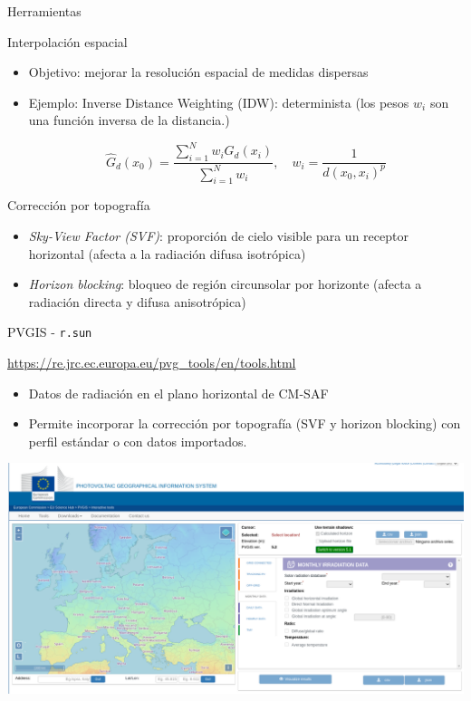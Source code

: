 \documentclass[aspectratio=169, usenames,svgnames,dvipsnames]{beamer}
\begin{document}
\begin{frame}[label={sec:orge9bb3dc}]{Herramientas}
\begin{block}{Interpolación espacial}
\begin{itemize}
\item \alert{Objetivo}: mejorar la resolución espacial de medidas dispersas

\item Ejemplo: \alert{Inverse Distance Weighting (IDW)}: determinista (los pesos \(w_i\) son una función inversa de la distancia.)

\[
\widehat{G}_d(x_0) = \frac{\sum_{i=1}^N w_i G_{d}(x_i)}{\sum_{i=1}^N w_i}, \quad w_i=\frac  {1}{d(x_0, x_i)^p}
\]
\end{itemize}
\end{block}
\begin{block}{Corrección por topografía}
\begin{itemize}
\item \emph{Sky-View Factor (SVF)}: proporción de cielo visible para un receptor horizontal (afecta a la radiación difusa isotrópica)

\item \emph{Horizon blocking}: bloqueo de región circunsolar por horizonte (afecta a radiación directa y difusa anisotrópica)
\end{itemize}
\end{block}
\end{frame}
\begin{frame}[label={sec:org7105a12},fragile]{PVGIS - \texttt{r.sun}}
 \begin{block}{\url{https://re.jrc.ec.europa.eu/pvg\_tools/en/tools.html}}
\begin{itemize}
\item Datos de radiación en el plano horizontal de CM-SAF
\item Permite incorporar la corrección por topografía (SVF y horizon blocking) con perfil estándar o con datos importados.
\end{itemize}

\begin{center}
\includegraphics[height=0.35\textwidth]{../figs/pvgis.png}
\end{center}
\end{block}
\end{frame}
\end{document}
